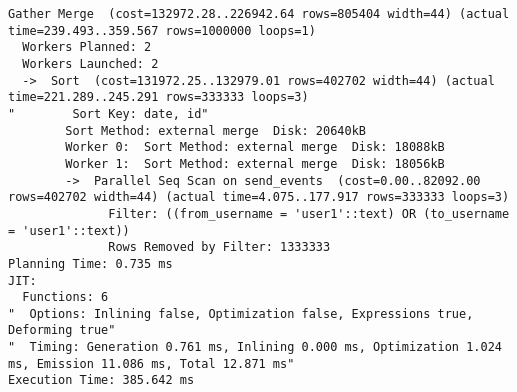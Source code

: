 \documentclass[../../../../main]{subfiles}
\begin{document}
    \begin{mdframed}
        \begin{verbatim}
Gather Merge  (cost=132972.28..226942.64 rows=805404 width=44) (actual time=239.493..359.567 rows=1000000 loops=1)
  Workers Planned: 2
  Workers Launched: 2
  ->  Sort  (cost=131972.25..132979.01 rows=402702 width=44) (actual time=221.289..245.291 rows=333333 loops=3)
"        Sort Key: date, id"
        Sort Method: external merge  Disk: 20640kB
        Worker 0:  Sort Method: external merge  Disk: 18088kB
        Worker 1:  Sort Method: external merge  Disk: 18056kB
        ->  Parallel Seq Scan on send_events  (cost=0.00..82092.00 rows=402702 width=44) (actual time=4.075..177.917 rows=333333 loops=3)
              Filter: ((from_username = 'user1'::text) OR (to_username = 'user1'::text))
              Rows Removed by Filter: 1333333
Planning Time: 0.735 ms
JIT:
  Functions: 6
"  Options: Inlining false, Optimization false, Expressions true, Deforming true"
"  Timing: Generation 0.761 ms, Inlining 0.000 ms, Optimization 1.024 ms, Emission 11.086 ms, Total 12.871 ms"
Execution Time: 385.642 ms
        \end{verbatim}
    \end{mdframed}
    \label{fig:streaming-chunk-sql-explain}
\end{document}
